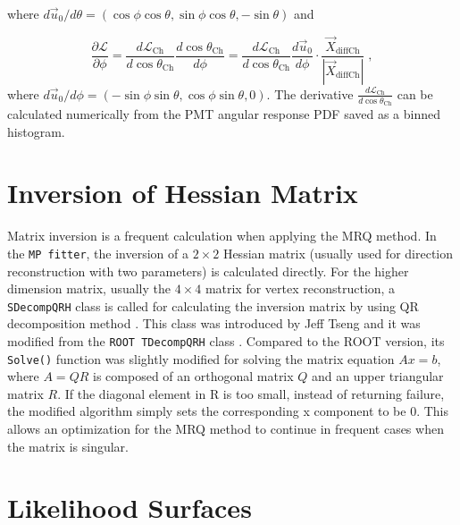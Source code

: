 where $d\vec{u}_0/d\theta=(\cos\phi\cos\theta, \sin\phi\cos\theta, -\sin\theta)$ and 

\begin{equation}
\frac{\partial \mathcal{L}}{\partial\phi}=\frac{d\mathcal{L}_{\mathrm{Ch}}}{d\cos\theta_{\mathrm{Ch}}}\frac{d\cos\theta_{\mathrm{Ch}}}{d\phi}
=\frac{d\mathcal{L}_{\mathrm{Ch}}}{d\cos\theta_{\mathrm{Ch}}}\frac{d\vec{u}_0}{d\phi}\cdot\frac{\vec{X}_{{\mathrm{diffCh}}}}{|\vec{X}_{{\mathrm{diffCh}}}|}\; ,
\end{equation} 
where $d\vec{u}_0/d\phi=(-\sin\phi\sin\theta, \cos\phi\sin\theta, 0)$. The derivative $\frac{d\mathcal{L}_{\mathrm{Ch}}}{d\cos\theta_{\mathrm{Ch}}}$ can be calculated numerically from the PMT angular response PDF saved as a binned histogram.

\section{Inversion of Hessian Matrix}
Matrix inversion is a frequent calculation when applying the MRQ method. In the \texttt{MP fitter}, the inversion of a $2\times 2$ Hessian matrix (usually used for direction reconstruction with two parameters) is calculated directly. For the higher dimension matrix, usually the $4\times 4$ matrix for vertex reconstruction, a \texttt{SDecompQRH} class is called for calculating the inversion matrix by using QR decomposition method \cite{press2007numerical}. This class was introduced by Jeff Tseng and it was modified from the \texttt{ROOT TDecompQRH} class \cite{TDecompQRH}. Compared to the ROOT version, its \texttt{Solve()} function was slightly modified for solving the matrix equation $Ax=b$, where $A = QR$ is composed of an orthogonal matrix $Q$ and an upper triangular matrix $R$. If the diagonal element in R is too small, instead of returning failure, the modified algorithm simply sets the corresponding x component to be 0. This allows an optimization for the MRQ method to continue in frequent cases when the matrix is singular.

\section{Likelihood Surfaces}\label{appendix:likelihoodSurface}

